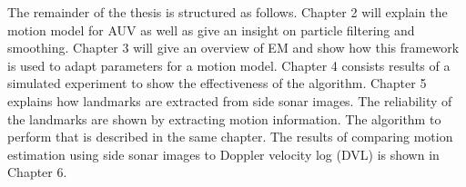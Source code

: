\documentclass[12pt]{dalcsthesis}
\begin{document}
The remainder of the thesis is structured as follows. Chapter 2 will explain the motion model for AUV as well as give an insight on particle filtering and smoothing. Chapter 3 will give an overview of EM and show how this framework is used to adapt parameters for a motion model. Chapter 4 consists results of a simulated experiment to show the effectiveness of the algorithm. Chapter 5 explains how landmarks are extracted from side sonar images. The reliability of the landmarks are shown by extracting motion information. The algorithm to perform that is described in the same chapter. The results of comparing motion estimation using side sonar images to Doppler velocity log (DVL) is shown in Chapter 6.
 

\end{document}

